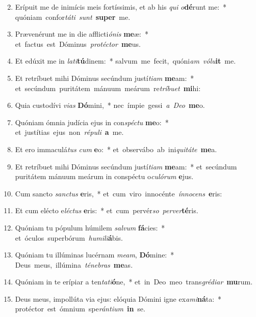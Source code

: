 \begin{flushleft}
\begin{enumerate}[leftmargin=*]
\setcounter{enumi}{1}

\item Erípuit me de inimícis meis fortíssimis, et ab his {\it qui} {\it o}\textbf{dé}runt me:~* \mbox{quóniam confor{\it tá}{\it ti} {\it sunt} \textbf{su}\textbf{per} me.}
\item Prævenérunt me in die afflicti{\it ó}{\it nis} \textbf{me}æ:~* \mbox{et factus est Dóminus {\it pro}{\it té}{\it ctor} \textbf{me}us.}
\item Et edúxit me in {\it la}{\it ti}\textbf{tú}dinem:~* \mbox{salvum me fecit, quóni{\it am} {\it vó}{\it lu}\textbf{it} me.}
\item Et retríbuet mihi Dóminus secúndum justí{\it ti}{\it am} \textbf{me}am:~* \mbox{et secúndum puritátem mánuum meárum re{\it trí}{\it bu}{\it et} \textbf{mi}hi:}
\item Quia custodívi {\it vi}{\it as} \textbf{Dó}mini,~* \mbox{nec ímpie gessi {\it a} {\it De}{\it o} \textbf{me}o.}
\item Quóniam ómnia judícia ejus in con{\it spé}{\it ctu} \textbf{me}o:~* \mbox{et justítias ejus non {\it ré}{\it pu}{\it li} \textbf{a} me.}
\item Et ero immaculá{\it tus} {\it cum} \textbf{e}o:~* \mbox{et observábo ab ini{\it qui}{\it tá}{\it te} \textbf{me}a.}
\item Et retríbuet mihi Dóminus secúndum justí{\it ti}{\it am} \textbf{me}am:~* et~secúndum puritátem mánuum meárum in conspéctu o{\it cu}{\it ló}{\it rum} \textbf{e}jus.
\item Cum sancto {\it san}{\it ctus} \textbf{e}ris,~* \mbox{et cum viro innocénte {\it ín}{\it no}{\it cens} \textbf{e}ris:}
\item Et cum elécto e{\it lé}{\it ctus} \textbf{e}ris:~* \mbox{et cum pervér{\it so} {\it per}{\it ver}\textbf{té}ris.}
\item Quóniam tu pópulum húmilem {\it sal}{\it vum} \textbf{fá}cies:~* \mbox{et óculos superbórum {\it hu}{\it mi}{\it li}\textbf{á}bis.}
\item Quóniam tu illúminas lucérnam {\it me}{\it am}, \textbf{Dó}mine:~* \mbox{Deus meus, illúmina {\it té}{\it ne}{\it bras} \textbf{me}as.}
\item Quóniam in te erípiar a ten{\it ta}{\it ti}\textbf{ó}ne,~* \mbox{et in Deo meo trans{\it gré}{\it di}{\it ar} \textbf{mu}rum.}
\item Deus meus, impollúta via ejus: elóquia Dómini igne ex{\it a}{\it mi}\textbf{ná}ta:~* \mbox{protéctor est ómnium spe{\it rán}{\it ti}{\it um} \textbf{in} se.}

\end{enumerate}
\end{flushleft}
